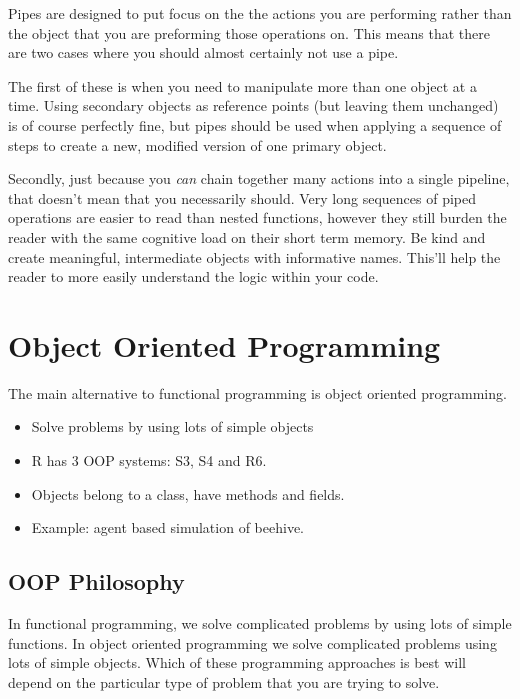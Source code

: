 \documentclass[
  12pt,
]{book}
\providecommand{\tightlist}{%
  \setlength{\itemsep}{0pt}\setlength{\parskip}{0pt}}
\begin{document}
Pipes are designed to put focus on the the actions you are performing rather than the object that you are preforming those operations on. This means that there are two cases where you should almost certainly not use a pipe.

The first of these is when you need to manipulate more than one object at a time. Using secondary objects as reference points (but leaving them unchanged) is of course perfectly fine, but pipes should be used when applying a sequence of steps to create a new, modified version of one primary object.

Secondly, just because you \emph{can} chain together many actions into a single pipeline, that doesn't mean that you necessarily should. Very long sequences of piped operations are easier to read than nested functions, however they still burden the reader with the same cognitive load on their short term memory. Be kind and create meaningful, intermediate objects with informative names. This'll help the reader to more easily understand the logic within your code.

\hypertarget{object-oriented-programming}{%
\section{Object Oriented Programming}\label{object-oriented-programming}}

The main alternative to functional programming is object oriented programming.

\begin{itemize}
\tightlist
\item
  Solve problems by using lots of simple objects
\item
  R has 3 OOP systems: S3, S4 and R6.
\item
  Objects belong to a class, have methods and fields.
\item
  Example: agent based simulation of beehive.
\end{itemize}

\hypertarget{oop-philosophy}{%
\subsection{OOP Philosophy}\label{oop-philosophy}}

In functional programming, we solve complicated problems by using lots of simple functions. In object oriented programming we solve complicated problems using lots of simple objects. Which of these programming approaches is best will depend on the particular type of problem that you are trying to solve.
\end{document}
